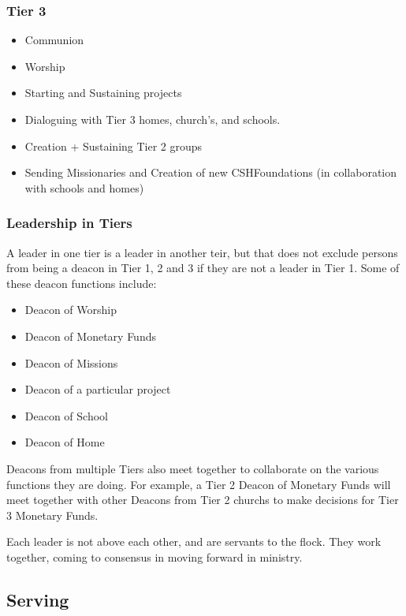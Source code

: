 \documentclass[CSHFoundation.tex]{subfiles}
\begin{document}
\subsubsection{Tier 3}
\begin{itemize}
\item Communion
\item Worship
\item Starting and Sustaining projects
\item Dialoguing with Tier 3 homes, church's, and schools.
\item Creation + Sustaining Tier 2 groups
\item Sending Missionaries and Creation of new CSHFoundations (in collaboration with schools and homes)
\end{itemize}

\subsubsection{Leadership in Tiers}

A leader in one tier is a leader in another teir, but that does not exclude persons from being a deacon in Tier 1, 2 and 3 if they are not a leader in Tier 1. Some of these deacon functions include:

\begin{itemize}
\item Deacon of Worship
\item Deacon of Monetary Funds
\item Deacon of Missions
\item Deacon of a particular project
\item Deacon of School
\item Deacon of Home
\end{itemize}

Deacons from multiple Tiers also meet together to collaborate on the various functions they are doing. For example, a Tier 2 Deacon of Monetary Funds will meet together with other Deacons from Tier 2 churchs to make decisions for Tier 3 Monetary Funds.

Each leader is not above each other, and are servants to the flock. They work together, coming to consensus in moving forward in ministry.

\subsection{Serving}
\end{document}

